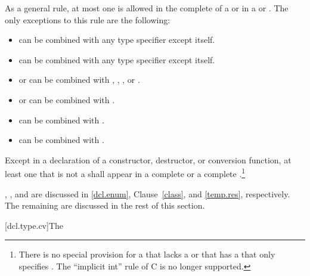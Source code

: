 \pnum
As a general rule, at most one 
is allowed in the complete
 of a  or in a
 or .
The only exceptions to this rule are the following:

\begin{itemize}
\item {} can be combined with any type specifier except itself.

\item {} can be combined with any type specifier except itself.

\item {} or  can be combined with
, , , or .

\item {} or  can be combined with .

\item {} can be combined with .

\item {} can be combined with .
\end{itemize}

\pnum
Except in a declaration of a constructor, destructor, or conversion
function, at least one  that is not a
 shall appear in a complete
 or a complete
.\footnote{There is no special
provision for a  that
lacks a  or that has a
 that only specifies .
The ``implicit int'' rule of C is no longer supported.}

\pnum
\enternote
{},
,
and
are discussed
in
\ref{dcl.enum},
Clause~\ref{class},
and
\ref{temp.res}, respectively. The remaining
 are discussed in the rest of this section.
\exitnote

[dcl.type.cv]{The }%
%
%
%

